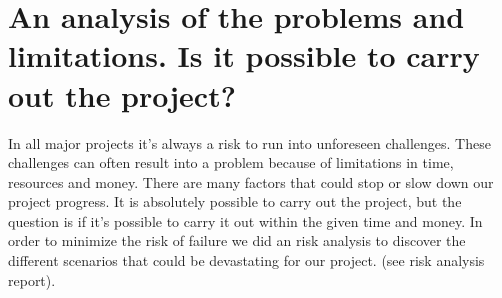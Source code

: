 \section{An analysis of the problems and limitations. Is it possible to carry out the project?}

In all major projects it's always a risk to run into unforeseen challenges. These challenges can often result into a problem because of limitations in time, resources and money.
There are many factors that could stop or slow down our project progress. It is absolutely possible to carry out the project, but the question is if it's possible to carry it out within the given time and money. In order to minimize the risk of failure we did an risk analysis to discover the different scenarios that could be devastating for our project. (see risk analysis report). 